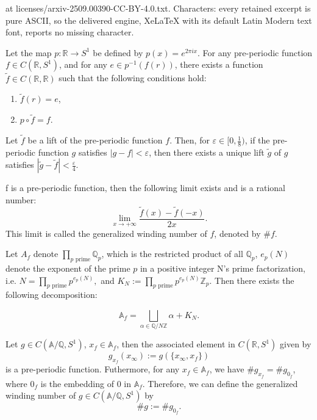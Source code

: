 \documentclass[10pt,a4paper]{amsart}
\newcommand{\A}{\mathbb{A}}
\begin{document}
at licenses/arxiv-2509.00390-CC-BY-4.0.txt. Characters: every retained excerpt is pure ASCII, so the delivered engine, XeLaTeX with its default Latin Modern text font, reports no missing character.
\begin{lemma}\label{lift}
    Let the map \( p: \mathbb{R} \to S^1 \) be defined by \( p(x) = e^{2\pi ix} \). For any pre-periodic function \( f \in C(\mathbb{R}, S^1) \), and for any \( e \in p^{-1}(f(r)) \), there exists a function \( \tilde{f} \in C(\mathbb{R}, \mathbb{R}) \) such that the following conditions hold:
\begin{enumerate}
    \item \( \tilde{f}(r) = e \),
    \item \( p \circ \tilde{f} = f \).
\end{enumerate}
\end{lemma}

\begin{lemma}\label{lift8}
Let \( \tilde{f} \) be a lift of the pre-periodic function \( f \). Then, for \( \varepsilon \in [0, \frac{1}{8}) \), if the pre-periodic function \( g \) satisfies \( |g - f| < \varepsilon \), then there exists a unique lift \( \tilde{g} \) of \( g \) satisfies \( |\tilde{g} - \tilde{f}| < \frac{\varepsilon}{4}\).
\end{lemma}

\begin{theorem}\label{gwd}
f is a pre-periodic function, then the following limit exists and is a rational number:
$$
\lim_{x\to+\infty}\frac{\tilde{f}(x)-\tilde{f}(-x)}{2x}.
$$
This limit is called the generalized winding number of \(f\), denoted by \(\#f\).
\end{theorem}

\begin{lemma}\label{china}
    Let \( A_f \) denote \(\prod\limits_{p \text{ prime}} \mathbb{Q}_p
 \), which is the restricted product of all \( \mathbb{Q}_p \),  \( e_p(N) \) denote the exponent of the prime \( p \) in a positive integer N's prime factorization, i.e. 
\(
N = \prod\limits_{p \text{ prime}} p^{e_p(N)},
\)
and \(K_N:=\prod\limits_{p \text{ prime}}p^{e_p(N)}\mathbb{Z}_p\). 
Then there exists the following decomposition:

$$
\A_f=\bigsqcup_{\alpha \in \mathbb{Q}/N\mathbb{Z}} \alpha+K_N.
$$
\end{lemma}

\begin{theorem}\label{gonggongwind}
    Let \( g \in C(\mathbb{A}/\mathbb{Q}, S^1) \), \( x_f \in \mathbb{A}_f \), then the associated element in \( C(\mathbb{R}, S^1) \) given by  
\[
g_{x_f}(x_\infty) := g(\{x_\infty, x_f\})
\]  
is a pre-periodic function. Futhermore, for any \( x_f \in \mathbb{A}_f\), we have \(\#g_{x_f}=\#g_{0_f}\), where \(0_f\) is the embedding of 0 in \(\A_f\). Therefore, we can define the generalized winding number of \( g \in C(\mathbb{A}/\mathbb{Q}, S^1) \) by
$$
\#g:=\#g_{0_f}.
$$
\end{theorem}
\end{document}

